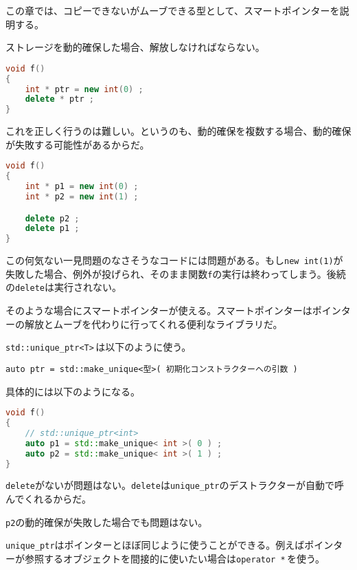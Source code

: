 
この章では、コピーできないがムーブできる型として、スマートポインターを説明する。

ストレージを動的確保した場合、解放しなければならない。

\begin{lstlisting}[language={C++}]
void f()
{
    int * ptr = new int(0) ;
    delete * ptr ;
}
\end{lstlisting}

これを正しく行うのは難しい。というのも、動的確保を複数する場合、動的確保が失敗する可能性があるからだ。

\begin{lstlisting}[language={C++}]
void f()
{
    int * p1 = new int(0) ;
    int * p2 = new int(1) ;

    delete p2 ;
    delete p1 ;
}
\end{lstlisting}

この何気ない一見問題のなさそうなコードには問題がある。もし\texttt{new int(1)}が失敗した場合、例外が投げられ、そのまま関数\texttt{f}の実行は終わってしまう。後続の\texttt{delete}は実行されない。

そのような場合にスマートポインターが使える。スマートポインターはポインターの解放とムーブを代わりに行ってくれる便利なライブラリだ。


\texttt{std::unique\_ptr<T>}\,は以下のように使う。

\begin{lstlisting}[style=grammar]
auto ptr = std::make_unique<型>( 初期化コンストラクターへの引数 )
\end{lstlisting}

具体的には以下のようになる。

\begin{lstlisting}[language={C++}]
void f()
{
    // std::unique_ptr<int>
    auto p1 = std::make_unique< int >( 0 ) ;
    auto p2 = std::make_unique< int >( 1 ) ;
}
\end{lstlisting}

\texttt{delete}がないが問題はない。\texttt{delete}は\texttt{unique\_ptr}のデストラクターが自動で呼んでくれるからだ。

\texttt{p2}の動的確保が失敗した場合でも問題はない。

\texttt{unique\_ptr}はポインターとほぼ同じように使うことができる。例えばポインターが参照するオブジェクトを間接的に使いたい場合は\texttt{operator *}\,を使う。

